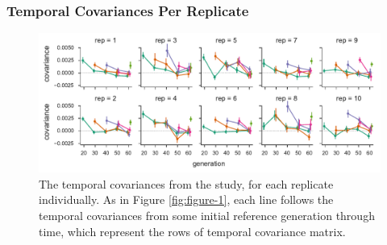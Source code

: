 \documentclass[11pt]{article}
\begin{document}
\clearpage

\subsubsection{\textcite{Barghi2019-qy} Temporal Covariances Per Replicate}
\begin{figure}[!ht]
  \centering
  \includegraphics[width=\textwidth]{figures/barghi-cov-panels.pdf}

  \caption{The temporal covariances from the \textcite{Barghi2019-qy} study,
  for each replicate individually. As in Figure \ref{fig:figure-1}, each line
  follows the temporal covariances from some initial reference generation through
  time, which represent the rows of temporal covariance matrix.}

  \label{suppfig:barghi-cov-panels}
\end{figure}


\clearpage
\end{document}
